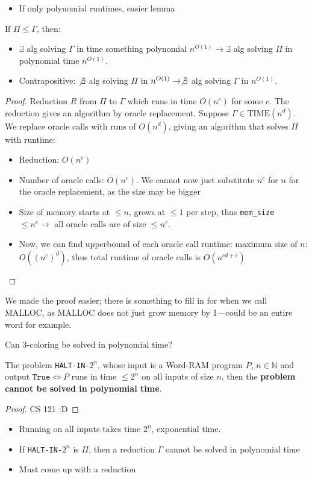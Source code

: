 \documentclass[11pt]{scrartcl}
\theoremstyle{dotlessP}
\theoremstyle{dotlessN}
\newcommand{\nats}{\mathbb{N}}
\begin{document}
\begin{itemize}
	\item If only polynomial runtimes, easier lemma
\end{itemize}
\begin{lemma}
	If $\Pi \leq \Gamma$, then:
	\begin{itemize}
		\item $\exists$ alg solving $\Gamma$ in time something polynomial $n^{O(1)} \to \exists$ alg solving $\Pi$ in polynomial time $n^{O(1)}$.
		\item Contrapositive: $\not\exists$ alg solving $\Pi$ in $n^{O(1)} \to \not\exists$ alg solving $\Gamma$ in $n^{O(1)}$.
	\end{itemize}
\end{lemma}
\begin{proof}
	Reduction $R$ from $\Pi$ to $\Gamma$ which runs in time $O(n^c)$ for some $c$. The reduction gives an algorithm by oracle replacement. Suppose $\Gamma \in \text{TIME}(n^d)$. We replace oracle calls with runs of  $O(n^d)$, giving an algorithm that solves $\Pi$ with runtime:
	\begin{itemize}
		\item Reduction: $O(n^c)$
		\item Number of oracle calls: $O(n^c)$. We cannot now just substitute $n^c$ for  $n$ for the oracle replacement, as the size may be bigger
		\item Size of memory starts at $\leq n$, grows at $\leq 1$ per step, thus \texttt{mem\_size} $\leq n^c \to $ all oracle calls are of size $\leq n^c$.
		\item Now, we can find upperbound of each oracle call runtime: maximum size of $n$: $O((n^{c})^d)$, thus total runtime of oracle calls is $O(n^{cd + c})$
	\end{itemize}
\end{proof}
\begin{remark}
	We made the proof easier; there is something to fill in for when we call MALLOC, as MALLOC does not just grow memory by 1---could be an entire word for example.
\end{remark}
\begin{remark*}
	Can 3-coloring be solved in polynomial time?
\end{remark*}
\begin{theorem}
	The problem \texttt{HALT-IN-$2^n$}, whose input is a Word-RAM program $P$, $n \in \nats$ and output $\texttt{True} \iff P$ runs in time $\leq 2^n$ on all inputs of size $n$, then the \textbf{problem cannot be solved in polynomial time}.
\end{theorem}
\begin{proof}
	CS 121 :D
\end{proof}
\begin{itemize}
	\item Running on all inputs takes time $2^n$, exponential time.
	\item If \texttt{HALT-IN-$2^n$} is $\Pi$, then a reduction $\Gamma$ cannot be solved in polynomial time
	\item Must come up with a reduction
\end{itemize}
\end{document}
